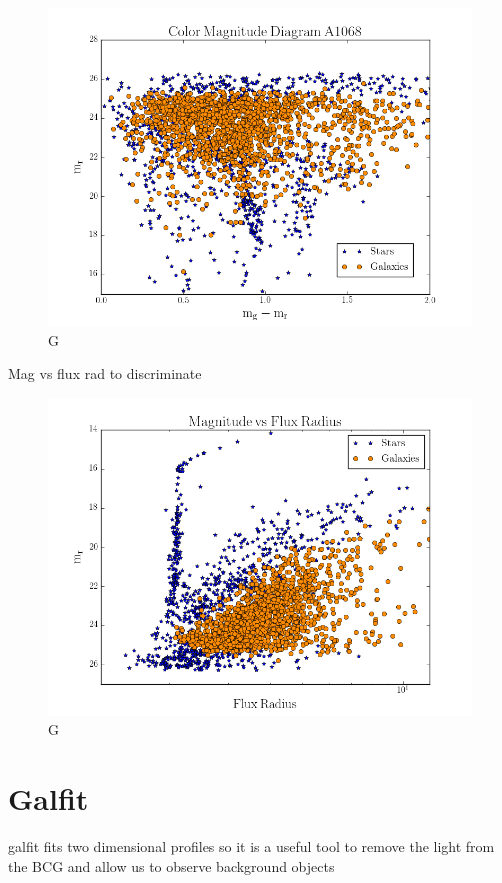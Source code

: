 \begin{figure}[H]
\centering
\includegraphics[width=12cm]{images/color mag.png}
\caption[M]{G}
\end{figure}

Mag vs flux rad to discriminate

\begin{figure}[H]
\centering
\includegraphics[width=12cm]{images/mag vs flux rad.png}
\caption[M]{G}
\end{figure}

\section{Galfit}

galfit fits two dimensional profiles so it is a useful tool to remove the light from the BCG and allow us to observe background objects

